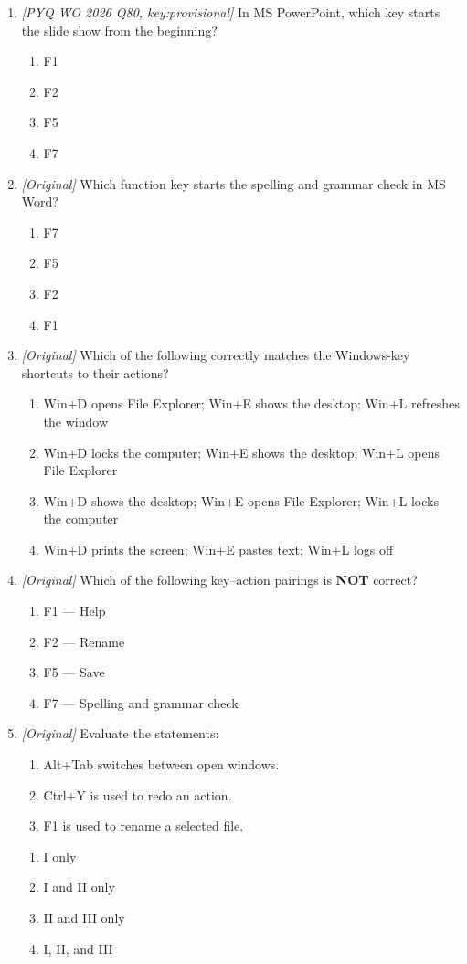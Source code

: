 \documentclass[11pt]{article}
\begin{document}
\begin{enumerate}[label=\textbf{Q\arabic*.}, leftmargin=*]
\item \textit{[PYQ WO 2026 Q80, key:provisional]} In MS PowerPoint, which key
  starts the slide show from the beginning?
  \begin{enumerate}[label=\Alph*.]
    \item F1
    \item F2
    \item F5
    \item F7
  \end{enumerate}
\item \textit{[Original]} Which function key starts the spelling and grammar
  check in MS Word?
  \begin{enumerate}[label=\Alph*.]
    \item F7
    \item F5
    \item F2
    \item F1
  \end{enumerate}
\item \textit{[Original]} Which of the following correctly matches the
  Windows-key shortcuts to their actions?
  \begin{enumerate}[label=\Alph*.]
    \item Win+D opens File Explorer; Win+E shows the desktop; Win+L refreshes
      the window
    \item Win+D locks the computer; Win+E shows the desktop; Win+L opens File
      Explorer
    \item Win+D shows the desktop; Win+E opens File Explorer; Win+L locks the
      computer
    \item Win+D prints the screen; Win+E pastes text; Win+L logs off
  \end{enumerate}
\item \textit{[Original]} Which of the following key--action pairings is
  \textbf{NOT} correct?
  \begin{enumerate}[label=\Alph*.]
    \item F1 --- Help
    \item F2 --- Rename
    \item F5 --- Save
    \item F7 --- Spelling and grammar check
  \end{enumerate}
\item \textit{[Original]} Evaluate the statements:
  \begin{enumerate}[label=\Roman*.]
    \item Alt+Tab switches between open windows.
    \item Ctrl+Y is used to redo an action.
    \item F1 is used to rename a selected file.
  \end{enumerate}
  \begin{enumerate}[label=\Alph*.]
    \item I only
    \item I and II only
    \item II and III only
    \item I, II, and III
  \end{enumerate}


\end{enumerate}
\end{document}
